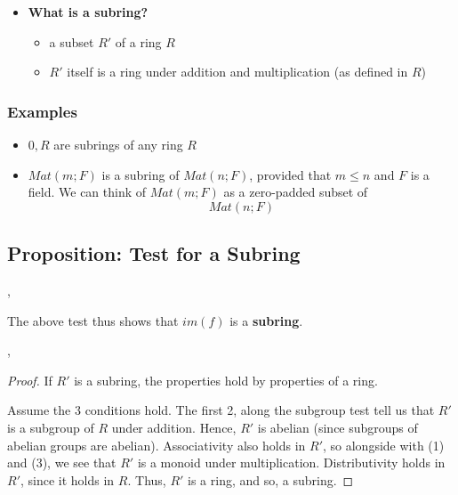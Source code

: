 \documentclass{exam}
\begin{document}
\begin{itemize}
    \item \textbf{What is a subring?}
    \begin{itemize}
        \item a subset $R'$ of a ring $R$
        \item $R'$ itself is a ring under addition and multiplication (as defined in $R$)
    \end{itemize}
\end{itemize}

\subsubsection{Examples}

\begin{itemize}
    \item ${0}, R$ are subrings of any ring $R$
    \item $Mat(m;F)$ is a subring of $Mat(n;F)$, provided that $m \leq n$ and $F$ is a field. We can think of $Mat(m;F)$ as a zero-padded subset of $$Mat(n;F)$$
\end{itemize}

\subsection{Proposition: Test for a Subring}


\sep 

The above test thus shows that $im(f)$ is a \textbf{subring}.

\sep 

\begin{proof}

If $R'$ is a subring, the properties hold by properties of a ring.

\bigskip

Assume the 3 conditions hold. The first 2, along the subgroup test tell us that $R'$ is a subgroup of $R$ under addition. Hence, $R'$ is abelian (since subgroups of abelian groups are abelian). Associativity also holds in $R'$, so alongside with (1) and (3), we see that $R'$ is a monoid under multiplication. Distributivity holds in $R'$, since it holds in $R$. Thus, $R'$ is a ring, and so, a subring.

\end{proof}
\end{document}
